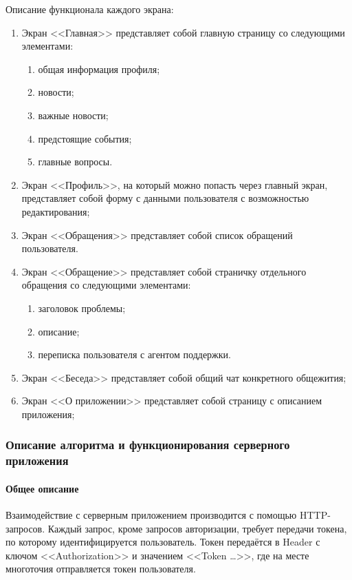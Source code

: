 \documentclass{../includes/TechDoc}
\begin{document}
    Описание функционала каждого экрана:
    \begin{enumerate}
        \item Экран <<Главная>> представляет собой главную страницу со следующими элементами:
        \begin{enumerate}
            \item общая информация профиля;
            \item новости;
            \item важные новости;
            \item предстоящие события;
            \item главные вопросы.
        \end{enumerate}

        \item Экран <<Профиль>>, на который можно попасть через главный экран, представляет собой форму с данными пользователя с возможностью редактирования;
        \item Экран <<Обращения>> представляет собой список обращений пользователя.
        \item Экран <<Обращение>> представляет собой страничку отдельного обращения со следующими элементами:
        \begin{enumerate}
            \item заголовок проблемы;
            \item описание;
            \item переписка пользователя с агентом поддержки.
        \end{enumerate}
        \item Экран <<Беседа>> представляет собой общий чат конкретного общежития;
        \item Экран <<О приложении>> представляет собой страницу с описанием приложения;
    \end{enumerate}

    \subsubsection{Описание алгоритма и функционирования серверного приложения}

    \paragraph{Общее описание}

    Взаимодействие с серверным приложением производится с помощью HTTP-запросов.
    Каждый запрос, кроме запросов авторизации, требует передачи токена, по которому идентифицируется пользователь.
    Токен передаётся в Header с ключом <<Authorization>> и значением <<Token \ldots>>, где на месте многоточия
    отправляется токен пользователя.\\
\end{document}

